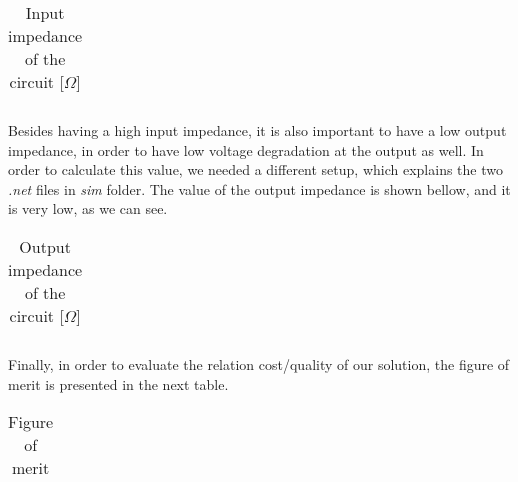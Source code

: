 \begin{table}[H]
  \centering
  \begin{tabular}{|l|r|}
    \hline    
   
    \end{tabular}
  \caption{Input impedance of the circuit [$\Omega$]}
    \label{tab:Zin}
\end{table}

\par Besides having a high input impedance, it is also important to have a low output impedance, in order to have low voltage degradation at the output as well. In order to calculate this value, we needed a different setup, which explains the two \textit{.net} files in \textit{sim} folder. The value of the output impedance is shown bellow, and it is very low, as we can see.

\begin{table}[H]
  \centering
  \begin{tabular}{|l|r|}
    \hline    
   
    \end{tabular}
  \caption{Output impedance of the circuit [$\Omega$]}
    \label{tab:Zout}
\end{table}

\par Finally, in order to evaluate the relation cost/quality of our solution, the figure of merit is presented in the next table.

\begin{table}[H]
  \centering
  \begin{tabular}{|l|r|}
    \hline    
   
    \end{tabular}
  \caption{Figure of merit}
    \label{tab:Zout}
\end{table}

\newpage
